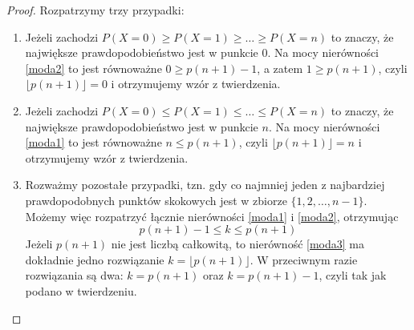 \documentclass{mwart}
\begin{document}
\begin{proof}
Rozpatrzymy trzy przypadki:
\begin{enumerate}
\item Jeżeli zachodzi $P(X=0)\geq P(X=1)\geq \ldots \geq P(X=n)$ to znaczy, że największe prawdopodobieństwo jest w punkcie $0$.
Na mocy nierówności \ref{moda2} to jest równoważne $0\geq p(n+1)-1$, a zatem $1\geq p(n+1)$, czyli $\lfloor p(n+1) \rfloor=0$ i otrzymujemy wzór z twierdzenia.
\item Jeżeli zachodzi $P(X=0)\leq P(X=1)\leq \ldots \leq P(X=n)$ to znaczy, że największe prawdopodobieństwo jest w punkcie $n$.
Na mocy nierówności \ref{moda1} to jest równoważne $n\leq p(n+1)$, czyli $\lfloor p(n+1) \rfloor=n$ i otrzymujemy wzór z twierdzenia.
\item Rozważmy pozostałe przypadki, tzn. gdy co najmniej jeden z najbardziej prawdopodobnych punktów skokowych jest w zbiorze $\{1,2,\ldots,n-1\}$. Możemy więc rozpatrzyć łącznie nierówności \ref{moda1} i \ref{moda2}, otrzymując
\begin{equation}
p(n+1)-1 \leq k \leq p(n+1) \label{moda3}
\end{equation} 
Jeżeli $p(n+1)$ nie jest liczbą całkowitą, to nierówność \ref{moda3} ma dokładnie jedno rozwiązanie $k=\lfloor p(n+1)\rfloor$.
W przeciwnym razie rozwiązania są dwa: $k=p(n+1)$ oraz $k=p(n+1)-1$, czyli tak jak podano w twierdzeniu.
\end{enumerate}
\end{proof}
\end{document}
